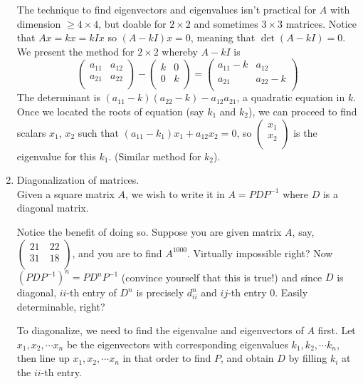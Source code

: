 \documentclass[11pt,a4paper]{article}
\begin{document}
\begin{enumerate}
The technique to find eigenvectors and eigenvalues isn't practical for $A$ with dimension $\ge 4\times 4$, but doable for $2\times 2$ and sometimes $3\times 3$ matrices. Notice that $Ax=kx=kIx$ so $(A-kI)x=0$, meaning that $\det (A-kI)=0.$ We present the method for $2\times 2$ whereby $A-kI$ is\\
 \[\left( \begin{array}{cc}
a_{11} & a_{12}\\
a_{21} & a_{22}\\
\end{array} \right)-
 \left( \begin{array}{cc}
k & 0\\
0 & k\\
\end{array} \right)=
 \left( \begin{array}{cc}
a_{11}-k & a_{12}\\
a_{21} & a_{22}-k\\
\end{array} \right)\]
The determinant is $(a_{11}-k)(a_{22}-k)-a_{12}a_{21}$, a quadratic equation in $k$. Once we located the roots of equation (say $k_1$ and $k_2$), we can proceed to find scalars $x_1$, $x_2$ such that $(a_{11}-k_1)x_1+a_{12}x_2=0$, so $\left( \begin{array}{cc}
x_1\\
x_2\\
\end{array} \right)$ is the eigenvalue for this $k_1$. (Similar method for $k_2$).

\item Diagonalization of matrices.\\
Given a square matrix $A$, we wish to write it in $A=PDP^{-1}$ where $D$ is a diagonal matrix.

Notice the benefit of doing so. Suppose you are given matrix $A$, say, $\left(\begin{array}{cc}
21\quad 22\\
31\quad 18\\
\end{array} \right)$, and you are to find $A^{1000}$. Virtually impossible right? Now $(PDP^{-1})^n=PD^{n}P^{-1}$ (convince yourself that this is true!) and since $D$ is diagonal, $ii$-th entry of $D^n$ is precisely $d_{ii}^n$ and $ij$-th entry 0. Easily determinable, right?

To diagonalize, we need to find the eigenvalue and eigenvectors of $A$ first. Let $x_1, x_2, \cdots x_n$ be the eigenvectors with corresponding eigenvalues $k_1, k_2,\cdots k_n$, then line up $x_1, x_2, \cdots x_n$ in that order to find $P$, and obtain $D$ by filling $k_i$ at the $ii$-th entry.
\end{enumerate}
\end{document}
